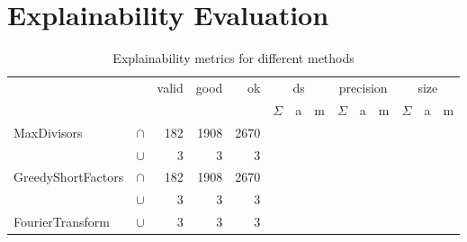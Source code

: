 \newpage
\section{Explainability Evaluation}

\begin{table}[h]
	\begin{tabular}{ll||rrrrrr|rrr|rrr}
		& & valid & good & ok &  \multicolumn{3}{c}{ds} & \multicolumn{3}{c}{precision} & \multicolumn{3}{c}{size}  \\
		& & & & & $\Sigma$ & a & m & $\Sigma$ & a & m & $\Sigma$ & a & m\\
		\hline
		\hline
		\multirow{2}{*}{MaxDivisors} & $\cap$ & 182 & 1908 & 2670 & & & & & & & & &  \\
		 & $\cup$ & 3 & 3 & 3 & & & & & & & & & \\
		 \hline
		\multirow{2}{*}{GreedyShortFactors} & $\cap$ & 182 & 1908 & 2670 & & & & & & & & & \\
		& $\cup$ & 3 & 3 & 3 & & & & & & & & & \\
		\hline
		FourierTransform & $\cup$ & 3 & 3 & 3 & & & & & & & & & \\
	\end{tabular}
	\caption{Explainability metrics for different methods}
	\label{tab:eval-metric}
\end{table}

